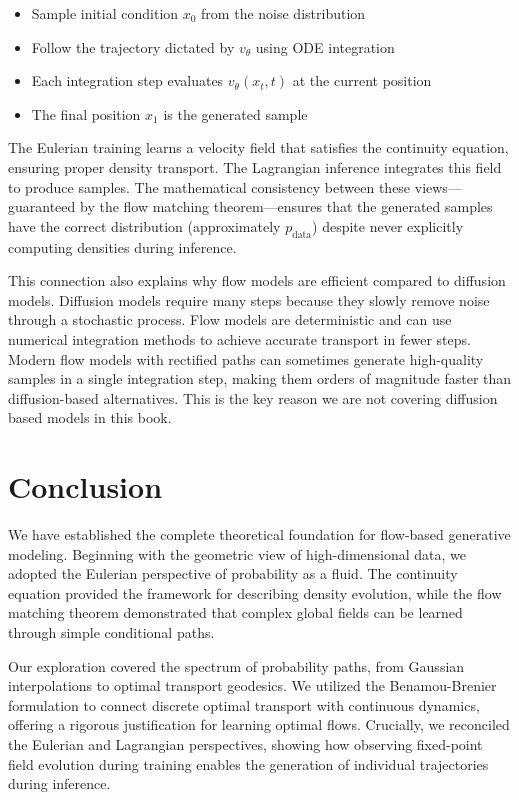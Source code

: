 \documentclass{book}
\begin{document}
\begin{itemize}
\item Sample initial condition $x_0$ from the noise distribution
\item Follow the trajectory dictated by $v_\theta$ using ODE integration
\item Each integration step evaluates $v_\theta(x_t, t)$ at the current position
\item The final position $x_1$ is the generated sample
\end{itemize}

The Eulerian training learns a velocity field that satisfies the continuity equation, ensuring proper density transport. The Lagrangian inference integrates this field to produce samples. The mathematical consistency between these views—guaranteed by the flow matching theorem—ensures that the generated samples have the correct distribution (approximately $p_{\text{data}}$) despite never explicitly computing densities during inference.

This connection also explains why flow models are efficient compared to diffusion models. Diffusion models require many steps because they slowly remove noise through a stochastic process. Flow models are deterministic and can use numerical integration methods to achieve accurate transport in fewer steps. Modern flow models with rectified paths can sometimes generate high-quality samples in a single integration step, making them orders of magnitude faster than diffusion-based alternatives. This is the key reason we are not covering diffusion based models in this book.

\section{Conclusion}

We have established the complete theoretical foundation for flow-based generative modeling. Beginning with the geometric view of high-dimensional data, we adopted the Eulerian perspective of probability as a fluid. The continuity equation provided the framework for describing density evolution, while the flow matching theorem demonstrated that complex global fields can be learned through simple conditional paths.

Our exploration covered the spectrum of probability paths, from Gaussian interpolations to optimal transport geodesics. We utilized the Benamou-Brenier formulation to connect discrete optimal transport with continuous dynamics, offering a rigorous justification for learning optimal flows. Crucially, we reconciled the Eulerian and Lagrangian perspectives, showing how observing fixed-point field evolution during training enables the generation of individual trajectories during inference.
\end{document}
